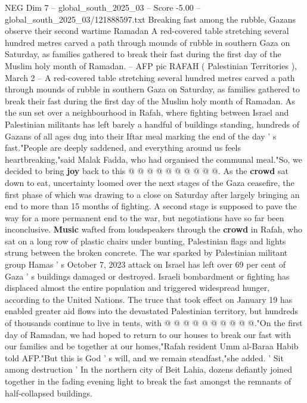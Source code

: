 \begin{textsample}{NEG Dim 7 – global\_south\_2025\_03 – Score -5.00 – global\_south\_2025\_03/121888597.txt}  \label{ex:f7_neg_355}
Breaking fast among the rubble, Gazans observe their second wartime Ramadan A red-covered table stretching several hundred metres carved a path through mounds of rubble in southern Gaza on Saturday, as families gathered to break their fast during the first day of the Muslim holy month of Ramadan. -- AFP pic RAFAH ( Palestinian Territories ), March 2 -- A red-covered table stretching several hundred metres carved a path through mounds of rubble in southern Gaza on Saturday, as families gathered to break their fast during the first day of the Muslim holy month of Ramadan.
As the sun set over a neighbourhood in Rafah, where fighting between Israel and Palestinian militants has left barely a handful of buildings standing, hundreds of Gazans of all ages dug into their Iftar meal marking the end of the day ' s fast."People are deeply saddened, and everything around us feels heartbreaking,"said Malak Fadda, who had organised the communal meal."So, we decided to bring \textbf{joy} back to this @ @ @ @ @ @ @ @ @ @.
As the \textbf{crowd} sat down to eat, uncertainty loomed over the next stages of the Gaza ceasefire, the first phase of which was drawing to a close on Saturday after largely bringing an end to more than 15 months of fighting.
A second stage is supposed to pave the way for a more permanent end to the war, but negotiations have so far been inconclusive. \textbf{Music} wafted from loudspeakers through the \textbf{crowd} in Rafah, who sat on a long row of plastic chairs under bunting, Palestinian flags and lights strung between the broken concrete.
The war sparked by Palestinian militant group Hamas ' s October 7, 2023 attack on Israel has left over 69 per cent of Gaza ' s buildings damaged or destroyed.
Israeli bombardment or fighting has displaced almost the entire population and triggered widespread hunger, according to the United Nations.
The truce that took effect on January 19 has enabled greater aid flows into the devastated Palestinian territory, but hundreds of thousands continue to live in tents, with @ @ @ @ @ @ @ @ @ @."On the first day of Ramadan, we had hoped to return to our houses to break our fast with our families and be together at our homes,"Rafah resident Umm al-Baraa Habib told AFP."But this is God ' s will, and we remain steadfast,"she added. ' Sit among destruction ' In the northern city of Beit Lahia, dozens defiantly joined together in the fading evening light to break the fast amongst the remnants of half-collapsed buildings.

\end{textsample}
